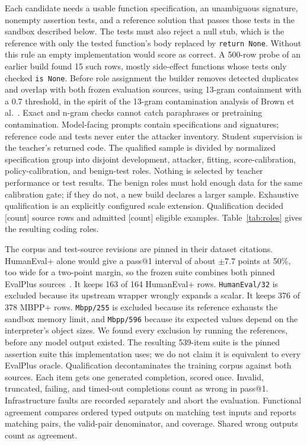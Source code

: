 \documentclass[journal]{IEEEtran}
\newcommand{\tbd}[1]{\textcolor{red!65!black}{[#1]}}
\begin{document}
Each candidate needs a usable function specification, an unambiguous signature, nonempty assertion tests, and a reference solution that passes those tests in the sandbox described below. The tests must also reject a null stub, which is the reference with only the tested function's body replaced by \texttt{return None}. Without this rule an empty implementation would score as correct. A 500-row probe of an earlier build found 15 such rows, mostly side-effect functions whose tests only checked \texttt{is None}. Before role assignment the builder removes detected duplicates and overlap with both frozen evaluation sources, using 13-gram containment with a 0.7 threshold, in the spirit of the 13-gram contamination analysis of Brown et al.~\cite{brown2020language}. Exact and n-gram checks cannot catch paraphrases or pretraining contamination. Model-facing prompts contain specifications and signatures; reference code and tests never enter the attacker inventory. Student supervision is the teacher's returned code. The qualified sample is divided by normalized specification group into disjoint development, attacker, fitting, score-calibration, policy-calibration, and benign-test roles. Nothing is selected by teacher performance or test results. The benign roles must hold enough data for the same calibration gate; if they do not, a new build declares a larger sample. Exhaustive qualification is an explicitly configured scale extension. Qualification decided \tbd{count} source rows and admitted \tbd{count} eligible examples. Table~\ref{tab:roles} gives the resulting coding roles.

The corpus and test-source revisions are pinned in their dataset citations. HumanEval+ alone would give a pass@1 interval of about $\pm7.7$ points at 50\%, too wide for a two-point margin, so the frozen suite combines both pinned EvalPlus sources~\cite{liu2023evalplus}. It keeps 163 of 164 HumanEval+ rows. \texttt{HumanEval/32} is excluded because its upstream wrapper wrongly expands a scalar. It keeps 376 of 378 MBPP+ rows. \texttt{Mbpp/255} is excluded because its reference exhausts the sandbox memory limit, and \texttt{Mbpp/596} because its expected values depend on the interpreter's object sizes. We found every exclusion by running the references, before any model output existed. The resulting 539-item suite is the pinned assertion suite this implementation uses; we do not claim it is equivalent to every EvalPlus oracle. Qualification decontaminates the training corpus against both sources. Each item gets one generated completion, scored once. Invalid, truncated, failing, and timed-out completions count as wrong in pass@1. Infrastructure faults are recorded separately and abort the evaluation. Functional agreement compares ordered typed outputs on matching test inputs and reports matching pairs, the valid-pair denominator, and coverage. Shared wrong outputs count as agreement.
\end{document}
